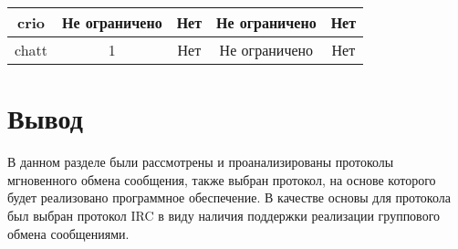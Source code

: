 \begin{table}[H]
{\begin{tabular}{|c|c|c|c|c|}
			crio            & Не ограничено                                                                     & Нет                                                                                     & Не ограничено                                                                               & Нет                                                                 \\ \hline
			chatt           & 1                                                                                 & Нет                                                                                     & Не ограничено                                                                               & Нет                                                                 \\ \hline
		\end{tabular}%
	}
\end{table}

\section*{Вывод}

В данном разделе были рассмотрены и проанализированы протоколы мгновенного обмена сообщения, также выбран протокол, на основе которого будет реализовано программное обеспечение. В качестве основы для протокола был выбран протокол IRC в виду наличия поддержки реализации группового обмена сообщениями.